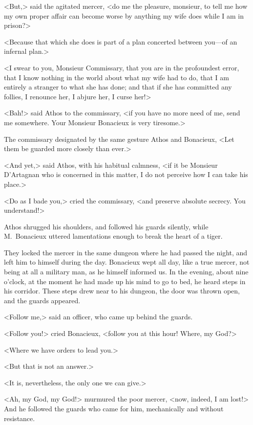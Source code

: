 <But,> said the agitated mercer, <do me the pleasure, monsieur, to tell me how my own proper affair can become worse by anything my wife does while I am in prison?> 

<Because that which she does is part of a plan concerted between you—of an infernal plan.> 

<I swear to you, Monsieur Commissary, that you are in the profoundest error, that I know nothing in the world about what my wife had to do, that I am entirely a stranger to what she has done; and that if she has committed any follies, I renounce her, I abjure her, I curse her!> 

<Bah!> said Athos to the commissary, <if you have no more need of me, send me somewhere. Your Monsieur Bonacieux is very tiresome.> 

The commissary designated by the same gesture Athos and Bonacieux, <Let them be guarded more closely than ever.> 

<And yet,> said Athos, with his habitual calmness, <if it be Monsieur D'Artagnan who is concerned in this matter, I do not perceive how I can take his place.> 

<Do as I bade you,> cried the commissary, <and preserve absolute secrecy. You understand!> 

Athos shrugged his shoulders, and followed his guards silently, while M.~Bonacieux uttered lamentations enough to break the heart of a tiger. 

They locked the mercer in the same dungeon where he had passed the night, and left him to himself during the day. Bonacieux wept all day, like a true mercer, not being at all a military man, as he himself informed us. In the evening, about nine o'clock, at the moment he had made up his mind to go to bed, he heard steps in his corridor. These steps drew near to his dungeon, the door was thrown open, and the guards appeared. 

<Follow me,> said an officer, who came up behind the guards. 

<Follow you!> cried Bonacieux, <follow you at this hour! Where, my God?> 

<Where we have orders to lead you.> 

<But that is not an answer.> 

<It is, nevertheless, the only one we can give.> 

<Ah, my God, my God!> murmured the poor mercer, <now, indeed, I am lost!> And he followed the guards who came for him, mechanically and without resistance. 

